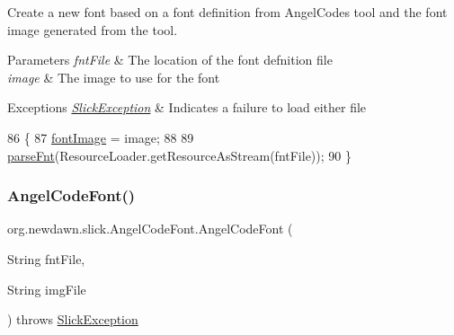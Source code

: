 Create a new font based on a font definition from Angel\+Code\textquotesingle{}s tool and the font image generated from the tool.


\begin{DoxyParams}{Parameters}
{\em fnt\+File} & The location of the font defnition file \\
\hline
{\em image} & The image to use for the font \\
\hline
\end{DoxyParams}

\begin{DoxyExceptions}{Exceptions}
{\em \mbox{\hyperlink{classorg_1_1newdawn_1_1slick_1_1_slick_exception}{Slick\+Exception}}} & Indicates a failure to load either file \\
\hline
\end{DoxyExceptions}

\begin{DoxyCode}
86                                                                             \{
87         \mbox{\hyperlink{classorg_1_1newdawn_1_1slick_1_1_angel_code_font_a891bf3b2a299313dc4f37c3808982aba}{fontImage}} = image;
88 
89         \mbox{\hyperlink{classorg_1_1newdawn_1_1slick_1_1_angel_code_font_a8950d304cfa460c9d2755900abda6c02}{parseFnt}}(ResourceLoader.getResourceAsStream(fntFile));
90     \}
\end{DoxyCode}
\mbox{\label{classorg_1_1newdawn_1_1slick_1_1_angel_code_font_a297faf1a0114300995431cb785de84a7}} 
\subsubsection{\texorpdfstring{Angel\+Code\+Font()}{AngelCodeFont()}\hspace{0.1cm}{\footnotesize\ttfamily [2/6]}}
{\footnotesize\ttfamily org.\+newdawn.\+slick.\+Angel\+Code\+Font.\+Angel\+Code\+Font (\begin{DoxyParamCaption}\item[{String}]{fnt\+File,  }\item[{String}]{img\+File }\end{DoxyParamCaption}) throws \mbox{\hyperlink{classorg_1_1newdawn_1_1slick_1_1_slick_exception}{Slick\+Exception}}\hspace{0.3cm}{\ttfamily [inline]}}

